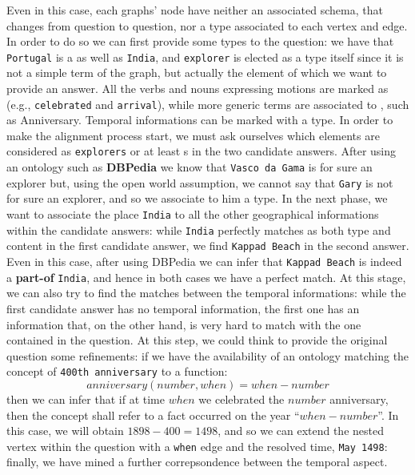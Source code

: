 \begin{example}
	Even in this case, each graphs' node have neither an associated schema, that changes from question to question, nor a type associated to each vertex and edge. In order to do so we can first provide some types to the question: we have that \texttt{Portugal} is a   as well as \texttt{India}, and \texttt{explorer} is elected as a type itself since it is not a simple term of the graph, but actually the element of which we want to provide an answer. All the verbs and nouns expressing motions are marked as  (e.g., \texttt{celebrated} and \texttt{arrival}), while more generic terms are associated to , such as Anniversary. Temporal informations can be marked with a  type. In order to make the alignment process start, we must ask ourselves which elements are considered as \texttt{explorers} or at least s in the two candidate answers. After using an ontology such as \textbf{DBPedia} we know that \texttt{Vasco da Gama} is for sure an explorer but, using the open world assumption, we cannot say that \texttt{Gary} is not for sure an explorer, and so we associate to him a  type. In the next phase, we want to associate the place  \texttt{India} to all the other geographical informations within the candidate answers: while \texttt{India} perfectly matches as both type and content in the first candidate answer, we find \texttt{Kappad Beach} in the second answer. Even in this case, after using DBPedia we can infer that \texttt{Kappad Beach} is indeed a \textbf{part-of} \texttt{India}, and hence in both cases we have a perfect match. At this stage, we can also try to find the matches between the temporal informations: while the first candidate answer has no temporal information, the first one has an information that, on the other hand, is very hard to match with the one contained in the question. At this step, we could think to provide the original question some refinements: if we have the availability of an ontology matching the concept of \texttt{400th anniversary} to a function: \[anniversary(number,when)=when-number\] then we can infer that if at time $when$ we celebrated the $number$ anniversary, then the concept shall refer to a fact occurred on the year ``$when-number$''. In this case, we will obtain $1898-400=1498$, and so we can extend the nested vertex within the question with a \texttt{when} edge and the resolved time, \texttt{May 1498}: finally, we have mined a further correpsondence between the temporal aspect.
	


\end{example}
